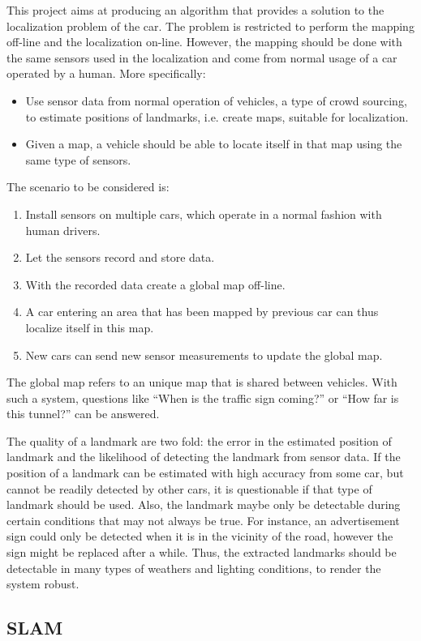 This project aims at producing an algorithm that provides a solution to the localization problem of the car. The problem is restricted to perform the mapping off-line and the localization on-line. However, the mapping should be done with the same sensors used in the localization and come from normal usage of a car operated by a human.  More
specifically:
\begin{itemize}
\item Use sensor data from normal operation of vehicles, a type of crowd sourcing, to estimate positions of landmarks, i.e. create maps, suitable for localization.

\item Given a map, a vehicle should be able to locate itself in that map using the same type of sensors.
\end{itemize}
The scenario to be considered is:
\begin{enumerate}
\item Install sensors on multiple cars, which operate in a normal fashion with human drivers. 
\item Let the sensors record and store data.
\item With the recorded data create a global map off-line.
\item A car entering an area that has been mapped by previous car can
  thus localize itself in this map.
\item New cars can send new sensor measurements to update the global
  map.
\end{enumerate}
The global map refers to an unique map that is shared between
vehicles. With such a system, questions like ``When is the traffic sign
coming?'' or  ``How far is this tunnel?'' can be answered. 

The quality of a landmark are two fold: the error in the estimated position of landmark and the likelihood of detecting the landmark from sensor data. If the position of a landmark can be estimated with high accuracy from some car, but cannot be readily detected by other cars, it is questionable if that type of landmark should be used. Also, the landmark maybe only be detectable during certain conditions that may not always be true. For instance, an advertisement sign could only be detected when it is in the vicinity of the road, however the sign might be replaced after a while. Thus, the extracted landmarks should be detectable in many types of 
weathers and lighting conditions, to render the system robust.  


\subsection{SLAM}

